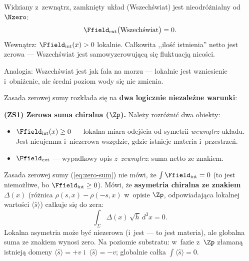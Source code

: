 \begin{axiom}\label{ax:zero}
Widziany z~zewn\k{a}trz, zamkni\k{e}ty uk\l{}ad (Wszech\'swiat) jest
nieodr\'o\.znialny od~$\Nzero$:
\begin{equation}\label{eq:zero-sum}
    \Ffield_{\mathrm{ext}}\bigl(\text{Wszech\'swiat}\bigr) = 0.
\end{equation}
Wewn\k{a}trz: $\Ffield_{\mathrm{int}}(x) > 0$ lokalnie. Ca\l{}kowita
,,ilo\'s\'c istnienia'' netto jest zerowa --- Wszech\'swiat jest
samowyzerowuj\k{a}c\k{a} si\k{e} fluktuacj\k{a} nico\'sci.
\end{axiom}

Analogia: Wszech\'swiat jest jak fala na morzu --- lokalnie jest
wzniesienie i~obni\.zenie, ale \'sredni poziom wody si\k{e} nie zmienia.

\begin{remark}\label{rem:zero-precyzacja}
Zasada zerowej sumy rozk\l{}ada si\k{e} na \textbf{dwa
logicznie niezale\.zne warunki}:

\medskip\noindent
\textbf{(ZS1) Zerowa suma chiralna ($\Zp$).}
Nale\.zy rozr\'o\.zni\'c dwa obiekty:
\begin{itemize}[nosep]
  \item $\Ffield_{\mathrm{int}}(x) \geq 0$ --- lokalna miara
        odej\'scia od symetrii \emph{wewn\k{a}trz} uk\l{}adu.
        Jest nieujemna i~niezerowa wsz\k{e}dzie, gdzie istnieje
        materia i~przestrze\'n.
  \item $\Ffield_{\mathrm{ext}}$ --- wypadkowy opis
        \emph{z~zewn\k{a}trz}: suma netto ze znakiem.
\end{itemize}
Zasada zerowej sumy (\ref{eq:zero-sum}) nie m\'owi, \.ze
$\int \Ffield_{\mathrm{int}} = 0$ (to jest niemo\.zliwe,
bo $\Ffield_{\mathrm{int}} \geq 0$). M\'owi, \.ze
\textbf{asymetria chiralna ze znakiem} $\Delta(x)$
(r\'o\.znica $\rho(s,x) - \rho(-s,x)$ w~opisie $\Zp$,
odpowiadaj\k{a}ca lokalnej warto\'sci $\langle\hat{s}\rangle$)
ca\l{}kuje si\k{e} do zera:
\begin{equation}\label{eq:zero-sum-precise}
    \int_\Sigma \Delta(x)\,\sqrt{h}\,d^3x = 0.
\end{equation}
Lokalna asymetria mo\.ze by\'c niezerowa (i~jest --- to jest
materia), ale globalna suma ze znakiem wynosi zero.
Na poziomie substratu: w~fazie z~$\Zp$ z\l{}aman\k{a}
istniej\k{a} domeny $\langle\hat{s}\rangle = +v$
i~$\langle\hat{s}\rangle = -v$; globalnie ca\l{}ka
$\int\langle\hat{s}\rangle = 0$.


\end{remark}
